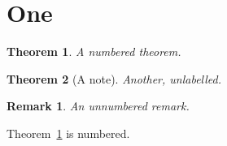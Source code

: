\documentclass{article}
\newtheorem{theorem}{Theorem}[section]
\newtheorem*{remark}{Remark}
\begin{document}
\section{One}
\begin{theorem}\label{thm:one}A numbered theorem.\end{theorem}
\begin{theorem}[A note]Another, unlabelled.\end{theorem}
\begin{remark}An unnumbered remark.\end{remark}
Theorem~\ref{thm:one} is numbered.
\end{document}
